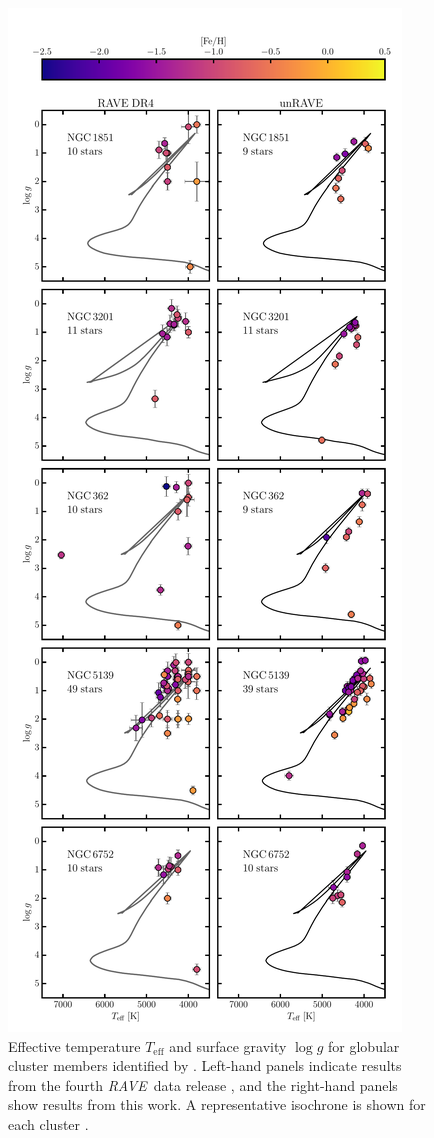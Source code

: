 \documentclass[preprint]{aastex}
\newcommand{\acronym}[1]{{\small{#1}}}
\newcommand{\project}[1]{\textsl{#1}}
\newcommand{\rave}{\project{\acronym{RAVE}}}
\newcommand{\teff}{T_{\mathrm{eff}}}
\newcommand{\logg}{\log g}
\begin{document}
\begin{figure}[p]
\center
\includegraphics[height=\textheight]{figures/globular-clusters.pdf}
\caption{Effective temperature $\teff$ and surface gravity $\logg$ for globular cluster members identified by \citet{Kunder_2014,Anguiano_2015}.  Left-hand panels indicate results from the fourth \rave\ data release \citep{Kordopatis_2013}, and the right-hand panels show results from this work.  A representative isochrone is shown for each cluster \citep{Bressan_2012}.\label{fig:globular-cluster-HRD}}
\end{figure}
\end{document}
